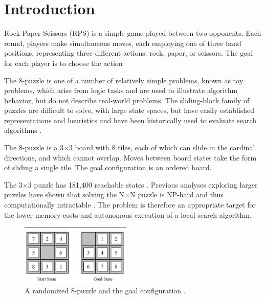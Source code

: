 
\section{Introduction}
\label{sec:intro}

Rock-Paper-Scissors (RPS) is a simple game played between two opponents.  Each round, players make simultaneous moves, each employing one of three hand positions, representing three different actions: rock, paper, or scissors.  The goal for each player is to choose the action 

The 8-puzzle is one of a number of relatively simple problems, known as toy problems, which arise from logic tasks and are used to illustrate algorithm behavior, but do not describe real-world problems. The sliding-block family of puzzles are difficult to solve, with large state spaces, but have easily established representations and heuristics and have been historically used to evaluate search algorithms \cite{intractable}. 

The 8-puzzle is a 3$\times$3 board with 8 tiles, each of which can slide in the cardinal directions, and which cannot overlap.  Moves between board states take the form of sliding a single tile.  The goal configuration is an ordered board. 

The 3$\times$3 puzzle has 181,400 reachable states \cite{aima}.  Previous analyses exploring larger puzzles have shown that solving the N$\times$N puzzle is NP-hard and thus computationally intractable \cite{intractable}.  The problem is therefore an appropriate target for the lower memory costs and autonomous execution of a local search algorithm. 

\begin{figure}[ht]
	\centering
	\includegraphics[width=0.47\textwidth]{figs/8-Puzzle.jpg}
	\caption{A randomized 8-puzzle and the goal configuration \cite{fig:puzzle}.}
	\label{fig:puzzle}
\end{figure}

